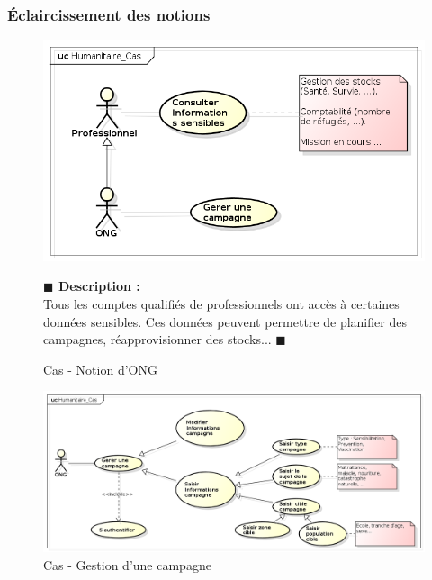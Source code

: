 \documentclass[11pt, titlepage]{report}
\newcommand{\debutDescription}{\noindent\textbf{\textcolor{DescriptionColor}{$\blacksquare$  Description : \\}}}
\newcommand{\finDescription}{\noindent\textcolor{DescriptionColor}{$\blacksquare$}}
\begin{document}
\subsubsection{Éclaircissement des notions}
\begin{figure}[h!]
\begin{center}
 \includegraphics[scale=.4]{../images/diagrammes/uml/exigence_2/cas_exigence_2.png} 
\caption{Cas - Notion d'ONG}
\end{center}
\debutDescription
Tous les comptes qualifiés de professionnels ont accès à certaines données sensibles. Ces données peuvent permettre de planifier des campagnes, réapprovisionner des stocks...
\finDescription
\end{figure}

\begin{figure}[h!]
\begin{center}
\includegraphics[scale=.4]{../images/diagrammes/uml/exigence_2/cas_gerer_campagne.png} 
\caption{Cas - Gestion d'une campagne}
\end{center}
\end{figure}
\end{document}
